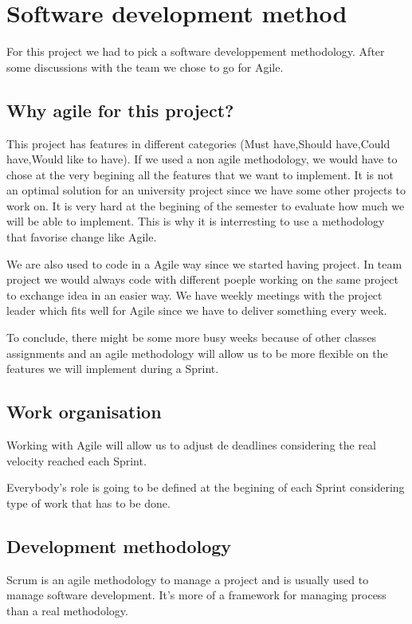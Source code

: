 \section{Software development method}

For this project we had to pick a software developpement methodology. After some discussions with the team we chose to go for Agile.

\subsection{Why agile for this project?}

This project has features in different categories (Must have,Should have,Could have,Would like to have). If we used a non agile methodology, we would have to chose at the very begining all the features that we want to implement.
It is not an optimal solution for an university project since we have some other projects to work on. It is very hard at the begining of the semester to evaluate how much we will be able to implement. This is why it is interresting to use a methodology that favorise change like Agile.\newline

We are also used to code in a Agile way since we started having project. In team project we would always code with different poeple working on the same project to exchange idea in an easier way.
We have weekly meetings with the project leader which fits well for Agile since we have to deliver something every week.\newline

To conclude, there might be some more busy weeks because of other classes assignments and an agile methodology will allow us to be more flexible on the features we will implement during a Sprint.

\subsection{Work organisation}
Working with Agile will allow us to adjust de deadlines considering the real velocity reached each Sprint.\newline

Everybody's role is going to be defined at the begining of each Sprint considering type of work that has to be done.


\subsection{Development methodology}
Scrum is an agile methodology to manage a project and is usually used to manage software development. It's more of a framework for managing process than a real methodology.\newline

